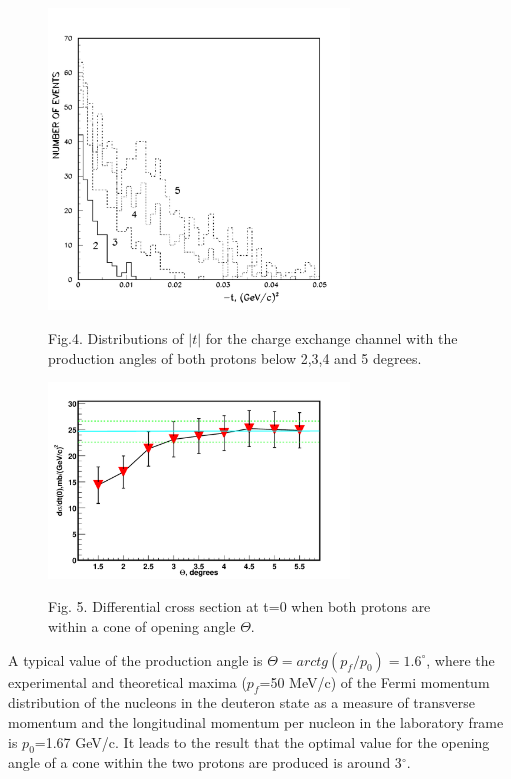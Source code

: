 \documentclass[a4paper,12pt]{article}
\begin{document}
\begin{figure}[hbt]
  \begin{center}
    \includegraphics[width=8cm]{tpp2345.pdf}
  \end{center}
  \vspace {0.4cm}
  Fig.4. Distributions of $\vert t \vert$ for the charge exchange channel with
  the production angles of both protons below 2,3,4 and 5 degrees. \\

\end {figure}

\begin{figure}[hbt]
  \begin{center}
    \includegraphics[width=8cm]{sigmaok.pdf}
  \end{center}
  \vspace{0.4mm}
  Fig. 5. Differential cross section at t=0 when both protons are within
  a cone of opening angle $\Theta$. \\

\end{figure}

A typical value of the production angle is
$\Theta=arctg(p_f/p_0)=1.6^{\circ}$, where
the experimental and theoretical maxima ($p_f$=50 MeV/c) of the Fermi
momentum distribution of the nucleons in the deuteron state as a measure
of transverse momentum and the longitudinal momentum per nucleon
in the laboratory frame is $p_0$=1.67 GeV/c.
It leads to the result that the optimal value for the opening angle
of a cone within the two protons are produced is around 3$^{\circ}$.
\end{document}
